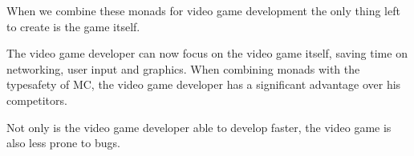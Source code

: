 When we combine these monads for video game development the only thing left to create is the game itself.

The video game developer can now focus on the video game itself, saving time on networking, user input and graphics.
When combining monads with the typesafety of MC, the video game developer has a significant advantage over his competitors.

Not only is the video game developer able to develop faster, the video game is also less prone to bugs.





